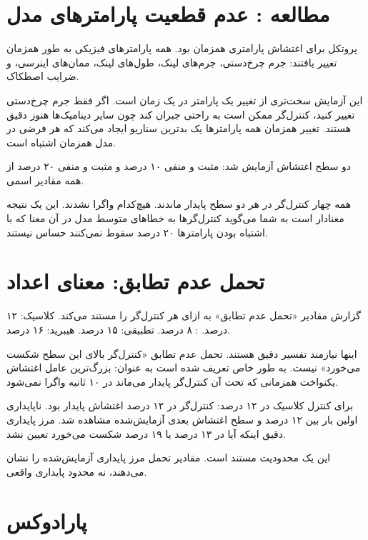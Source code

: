 \documentclass[12pt, a4paper]{article}
\newcommand{\dash}{\lr{---}}
\begin{document}
\section{مطالعه : عدم قطعيت پارامترهای مدل}

پروتکل برای  اغتشاش پارامتری همزمان بود. همه پارامترهای فيزيکی به طور همزمان تغيير يافتند: جرم چرخ‌دستی، جرم‌های لينک، طول‌های لينک، ممان‌های اينرسی، و ضرايب اصطکاک.

اين آزمايش سخت‌تری از تغيير يک پارامتر در يک زمان است. اگر فقط جرم چرخ‌دستی تغيير کنيد، کنترل‌گر ممکن است به راحتی جبران کند چون ساير ديناميک‌ها هنوز دقيق هستند. تغيير همزمان همه پارامترها يک بدترين سناريو ايجاد می‌کند که هر فرضی در مدل همزمان اشتباه است.

دو سطح اغتشاش آزمايش شد: مثبت و منفی ۱۰ درصد و مثبت و منفی ۲۰ درصد از همه مقادير اسمی.

همه چهار کنترل‌گر در هر دو سطح پايدار ماندند. هيچ‌کدام واگرا نشدند. اين يک نتيجه معنادار است \dash{} به شما می‌گويد کنترل‌گرها به خطاهای متوسط مدل در آن معنا که با اشتباه بودن پارامترها ۲۰ درصد سقوط نمی‌کنند حساس نيستند.

\section{تحمل عدم تطابق: معنای اعداد}

گزارش مقادير «تحمل عدم تطابق» به ازای هر کنترل‌گر را مستند می‌کند. کلاسيک: ۱۲ درصد. : ۸ درصد. تطبيقی: ۱۵ درصد. هيبريد: ۱۶ درصد.

اينها نيازمند تفسير دقيق هستند. تحمل عدم تطابق «کنترل‌گر بالای اين سطح شکست می‌خورد» نيست. به طور خاص تعريف شده است به عنوان: بزرگ‌ترين عامل اغتشاش يکنواخت همزمانی که تحت آن کنترل‌گر پايدار می‌ماند \dash{} در ۱۰ ثانيه واگرا نمی‌شود.

برای کنترل کلاسيک در ۱۲ درصد: کنترل‌گر در ۱۲ درصد اغتشاش پايدار بود. ناپايداری اولين بار بين ۱۲ درصد و سطح اغتشاش بعدی آزمايش‌شده مشاهده شد. مرز پايداری دقيق \dash{} اينکه آيا در ۱۳ درصد يا ۱۹ درصد شکست می‌خورد \dash{} تعيين نشد.

اين يک محدوديت مستند است. مقادير تحمل مرز پايداری آزمايش‌شده را نشان می‌دهند، نه محدود پايداری واقعی.

\section{پارادوکس }
\end{document}
